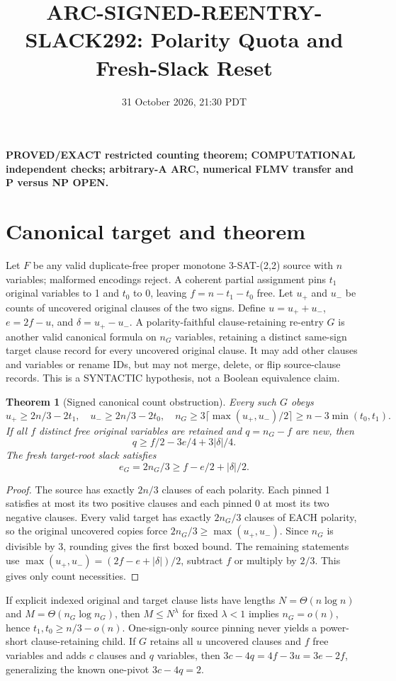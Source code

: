 \documentclass{article}
\title{ARC-SIGNED-REENTRY-SLACK292: Polarity Quota and Fresh-Slack Reset}
\date{31 October 2026, 21:30 PDT}
\newtheorem{theorem}{Theorem}
\begin{document}
\maketitle
\noindent\textbf{PROVED/EXACT restricted counting theorem; COMPUTATIONAL independent checks; arbitrary-A ARC, numerical FLMV transfer and P versus NP OPEN.}

\section{Canonical target and theorem}
Let $F$ be any valid duplicate-free proper monotone 3-SAT-(2,2) source with $n$ variables; malformed encodings reject. A coherent partial assignment pins $t_1$ original variables to 1 and $t_0$ to 0, leaving $f=n-t_1-t_0$ free. Let $u_+$ and $u_-$ be counts of uncovered original clauses of the two signs. Define $u=u_++u_-$, $e=2f-u$, and $\delta=u_+-u_-$. A polarity-faithful clause-retaining re-entry $G$ is another valid canonical formula on $n_G$ variables, retaining a distinct same-sign target clause record for every uncovered original clause. It may add other clauses and variables or rename IDs, but may not merge, delete, or flip source-clause records. This is a SYNTACTIC hypothesis, not a Boolean equivalence claim.

\begin{theorem}[Signed canonical count obstruction]
Every such $G$ obeys
\[
u_+\ge 2n/3-2t_1,\quad u_-\ge 2n/3-2t_0,
\quad
\boxed{n_G\ge3\lceil\max(u_+,u_-)/2\rceil\ge n-3\min(t_0,t_1).}
\]
If all $f$ distinct free original variables are retained and $q=n_G-f$ are new, then
\[
\boxed{q\ge f/2-3e/4+3|\delta|/4.}
\]
The fresh target-root slack satisfies
\[
\boxed{e_G=2n_G/3\ge f-e/2+|\delta|/2.}
\]
\end{theorem}
\begin{proof}
The source has exactly $2n/3$ clauses of each polarity. Each pinned 1 satisfies at most its two positive clauses and each pinned 0 at most its two negative clauses. Every valid target has exactly $2n_G/3$ clauses of EACH polarity, so the original uncovered copies force $2n_G/3\ge\max(u_+,u_-)$. Since $n_G$ is divisible by 3, rounding gives the first boxed bound. The remaining statements use $\max(u_+,u_-)=(2f-e+|\delta|)/2$, subtract $f$ or multiply by $2/3$. This gives only count necessities.
\end{proof}
If explicit indexed original and target clause lists have lengths $N=\Theta(n\log n)$ and $M=\Theta(n_G\log n_G)$, then $M\le N^\lambda$ for fixed $\lambda<1$ implies $n_G=o(n)$, hence $t_1,t_0\ge n/3-o(n)$. One-sign-only source pinning never yields a power-short clause-retaining child. If $G$ retains all $u$ uncovered clauses and $f$ free variables and adds $c$ clauses and $q$ variables, then $3c-4q=4f-3u=3e-2f$, generalizing the known one-pivot $3c-4q=2$.
\end{document}
